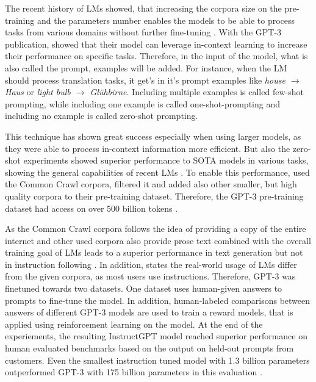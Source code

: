 \documentclass[a4paper,oneside,bibliography=totoc]{scrbook}
\begin{document}
The recent history of \acp{LM} showed, that increasing the corpora size on the pre-training and the parameters number enables the models to be able to process tasks from various domains without further fine-tuning \cite{Radford2018,Radford2019,Brown2020}. With the GPT-3 publication, \citet{Brown2020} showed that their model can leverage in-context learning to increase their performance on specific tasks. Therefore, in the input of the model, what is also called the prompt, examples will be added. For instance, when the \ac{LM} should process translation tasks, it get's in it's prompt examples like \textit{house $\rightarrow$ Haus} or \textit{light bulb $\rightarrow$ Glühbirne}. Including multiple examples is called few-shot prompting, while including one example is called one-shot-prompting and including no example is called zero-shot prompting.

This technique has shown great success especially when using larger models, as they were able to process in-context information more efficient. But also the zero-shot experiments showed superior performance to SOTA models in various tasks, showing the general capabilities of recent \acp{LM} \cite{Brown2020}. To enable this performance, \citet{Brown2020} used the Common Crawl corpora, filtered it and added also other smaller, but high quality corpora to their pre-training dataset. Therefore, the \ac{GPT}-3 pre-training dataset had access on over 500 billion tokens \cite{Brown2020}.

As the Common Crawl corpora follows the idea of providing a copy of the entire internet \cite{CCF2025} and other used corpora also provide prose text combined with the overall training goal of \acp{LM} leads to a superior performance in text generation but not in instruction following \cite{Ouyang2022}. In addition, \citet{Ouyang2022} states the real-world usage of \acp{LM} differ from the given corpora, as most users use instructions. Therefore, \ac{GPT}-3 was finetuned towards two datasets. One dataset uses human-given answers to prompts to fine-tune the model. In addition, human-labeled comparisons between answers of different \ac{GPT}-3 models are used to train a reward models, that is applied using reinforcement learning on the model. At the end of the experiements, the resulting InstructGPT model reached superior performance on human evaluated benchmarks based on the output on held-out prompts from customers. Even the smallest instruction tuned model with 1.3 billion parameters outperformed \ac{GPT}-3 with 175 billion parameters in this evaluation \cite{Ouyang2022}.
\end{document}
